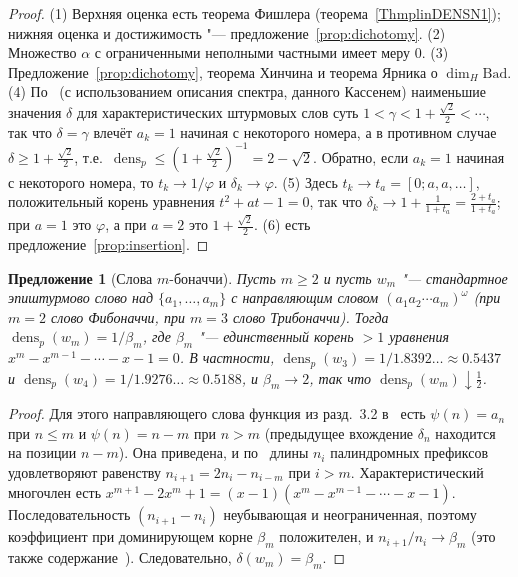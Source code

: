 \documentclass[a4paper,14pt]{extreport}
\theoremstyle{plain}
\newtheorem{proposition}[theorem]{Предложение}
\theoremstyle{definition}
\theoremstyle{remark}
\begin{document}
\begin{proof}
	(1) Верхняя оценка есть теорема Фишлера (теорема~\ref{ThmplinDENSN1}); нижняя оценка и достижимость "--- предложение~\ref{prop:dichotomy}.
	(2) Множество $\alpha$ с ограниченными неполными частными имеет меру $0$.
	(3) Предложение~\ref{prop:dichotomy}, теорема Хинчина и теорема Ярника о $\dim_H\mathrm{Bad}$.
	(4) По~\cite[теорема~1.4]{Fischler} (с использованием описания спектра, данного Кассенем) наименьшие значения $\delta$ для характеристических штурмовых слов суть $1<\gamma<1+\frac{\sqrt2}{2}<\cdots$, так что $\delta=\gamma$ влечёт $a_k=1$ начиная с некоторого номера, а в противном случае $\delta\ge1+\frac{\sqrt2}2$, т.е.\ $\operatorname{dens}_p\le(1+\frac{\sqrt2}2)^{-1}=2-\sqrt2$. Обратно, если $a_k=1$ начиная с некоторого номера, то $t_k\to1/\varphi$ и $\delta_k\to\varphi$.
	(5) Здесь $t_k\to t_a=[0;a,a,\dots]$, положительный корень уравнения $t^2+at-1=0$, так что $\delta_k\to1+\frac1{1+t_a}=\frac{2+t_a}{1+t_a}$; при $a=1$ это $\varphi$, а при $a=2$ это $1+\frac{\sqrt2}2$.
	(6) есть предложение~\ref{prop:insertion}.
\end{proof}

\begin{proposition}[Слова $m$-боначчи]\label{prop:mbonacci}
	Пусть $m\ge2$ и пусть $w_m$ "--- стандартное эпиштурмово слово над $\{a_1,\dots,a_m\}$ с направляющим словом $(a_1a_2\cdots a_m)^\omega$ (при $m=2$ слово Фибоначчи, при $m=3$ слово Трибоначчи). Тогда $\operatorname{dens}_p(w_m)=1/\beta_m$, где $\beta_m$ "--- единственный корень $>1$ уравнения $x^m-x^{m-1}-\cdots-x-1=0$. В частности, $\operatorname{dens}_p(w_3)=1/1.8392\ldots\approx0.5437$ и $\operatorname{dens}_p(w_4)=1/1.9276\ldots\approx0.5188$, и $\beta_m\to2$, так что $\operatorname{dens}_p(w_m)\downarrow\tfrac12$.
\end{proposition}

\begin{proof}
	Для этого направляющего слова функция из разд.~3.2 в~\cite{Fischler} есть $\psi(n)=a_n$ при $n\le m$ и $\psi(n)=n-m$ при $n>m$ (предыдущее вхождение $\delta_n$ находится на позиции $n-m$). Она приведена, и по~\cite[теорема~4.12]{Fischler} длины $n_i$ палиндромных префиксов удовлетворяют равенству $n_{i+1}=2n_i-n_{i-m}$ при $i>m$. Характеристический многочлен есть $x^{m+1}-2x^m+1=(x-1)(x^m-x^{m-1}-\cdots-x-1)$. Последовательность $(n_{i+1}-n_i)$ неубывающая и неограниченная, поэтому коэффициент при доминирующем корне $\beta_m$ положителен, и $n_{i+1}/n_i\to\beta_m$ (это также содержание~\cite[предложение~6.2]{Fischler}). Следовательно, $\delta(w_m)=\beta_m$.
\end{proof}
\end{document}
